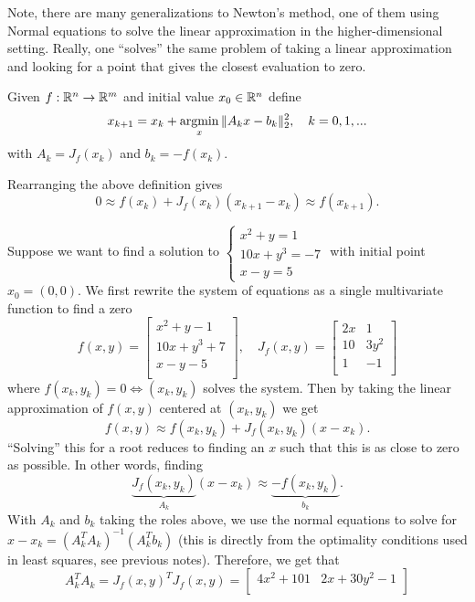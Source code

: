\documentclass[11pt]{article}
\begin{document}
Note, there are many generalizations to Newton's method, one of them using Normal equations to solve the linear approximation in the higher-dimensional setting. Really, one ``solves'' the same problem of taking a linear approximation and looking for a point that gives the closest evaluation to zero.
\begin{definition}{}{}
    Given $f : \R^n \to \R^m$ and initial value $x_0 \in \R^n$ define $$x_{k+1} = x_k + \argmin_{x} \|A_kx-b_k\|_2^2, \quad k = 0, 1, ... $$ with $A_k = J_f(x_k)$ and $b_k = -f(x_k).$
\end{definition}
Rearranging the above definition gives $$0 \approx f(x_k) + J_f(x_k)(x_{k+1}-x_k) \approx f(x_{k+1}).$$
\begin{example}{}{}
    Suppose we want to find a solution to $\begin{cases}
        x^2 + y = 1\\
        10x+y^3 = -7\\
        x-y = 5
    \end{cases}$ with initial point $x_0 = (0,0)$. We first rewrite the system of equations as a single multivariate function to find a zero $$f(x,y) = \begin{bmatrix}
        x^2+y-1\\
        10x+y^3+7\\
        x-y-5\\
    \end{bmatrix}, \quad J_f(x,y) = \begin{bmatrix}
        2x & 1\\
        10 & 3y^2\\
        1 & -1\\
    \end{bmatrix}$$ where $f(x_k,y_k) = 0 \Longleftrightarrow (x_k, y_k)$ solves the system. Then by taking the linear approximation of $f(x,y)$ centered at $(x_k, y_k)$ we get $$f(x,y) \approx f(x_k, y_k) + J_f(x_k, y_k) (x-x_k).$$
    ``Solving'' this for a root reduces to finding an $x$ such that this is as close to zero as possible. In other words, finding $$\underbrace{J_f(x_k, y_k)}_{A_k}(x-x_k) \approx \underbrace{-f(x_k, y_k)}_{b_k}.$$ With $A_k$ and $b_k$ taking the roles above, we use the normal equations to solve for $x-x_k = (A_k^T A_k)^{-1}(A_k^T b_k)$ (this is directly from the optimality conditions used in least squares, see previous notes). Therefore, we get that $$A_k^TA_k = J_f(x,y)^T J_f(x,y) = \begin{bmatrix}
        4x^2 + 101 & 2x+30y^2-1\\

\end{bmatrix}$$
\end{example}
\end{document}
